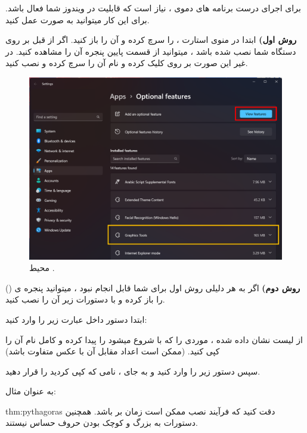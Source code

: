 {\large
برای اجرای درست برنامه های دموی  ، نیاز است که قابلیت  در ویندوز شما فعال باشد.
برای این کار میتوانید به صورت عمل کنید.

\textbf{روش اول)}
ابتدا در منوی استارت ،  را سرچ کرده و آن را باز کنید.
اگر  از قبل بر روی دستگاه شما نصب شده باشد ، میتوانید از قسمت پایین پنجره آن را مشاهده کنید.
در غیر این صورت بر روی  کلیک کرده و نام آن را سرچ کرده و نصب کنید.

    \begin{figure}[H]
        \centering
        \setlength{\belowcaptionskip}{-10pt}
        \includegraphics[width=\textwidth]{Images/1.Intro.4.1.png}
        \caption{محیط .}
    \end{figure}

    \textbf{روش دوم)}
    اگر به هر دلیلی روش اول برای شما قابل انجام نبود ، میتوانید پنجره ی  () را باز کرده و با دستورات زیر آن را نصب کنید.

    ابتدا دستور داخل  عبارت زیر را وارد کنید:

    \begin{flushleft}
    \end{flushleft}

    از لیست نشان داده شده ، موردی را که با  شروع میشود را پیدا کرده و کامل نام آن را کپی کنید. (ممکن است اعداد مقابل آن با عکس متفاوت باشد)

    سپس دستور زیر را وارد کنید و به جای  ، نامی که کپی کردید را قرار دهید.

    \begin{flushleft}
    \end{flushleft}

    به عنوان مثال:

    \begin{flushleft}
        \normalsize
    \end{flushleft}
}

\begin{theo}{thm:pythagoras}
{\large
دقت کنید که فرآیند نصب ممکن است زمان بر باشد. همچنین دستورات  به بزرگ و کوچک بودن حروف حساس نیستند.
}
\end{theo}

\newpage
